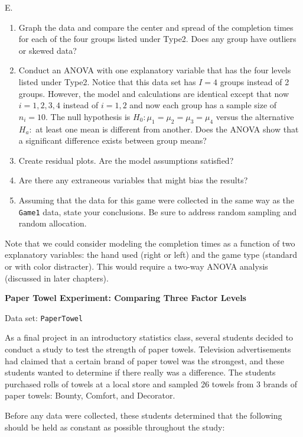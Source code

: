 \documentclass[
]{report}
\newcounter{excount}
\renewcommand{\theexcount}{E\arabic{excount}}
\begin{document}
\begin{list}{\theexcount.}{ \setlength{\itemsep}{1.2em}}
    \begin{enumerate}
      \item Graph the data and compare the center and spread of the completion times for each of the four groups listed under Type2. Does any group have outliers or skewed data?
      \item Conduct an ANOVA with one explanatory variable that has the four levels listed under Type2. Notice that this data set has $I = 4$ groups instead of 2 groups. However, the model and calculations are identical except that now $i = 1, 2, 3, 4$ instead of $i = 1, 2$ and now each group has a sample size of $n_i = 10$. The null hypothesis is $H_0\colon \mu_1 = \mu_2 = \mu_3 = \mu_4$ versus the alternative $H_a\colon$ at least one mean is different from another. Does the ANOVA show that a significant difference exists between group means?
      \item Create residual plots. Are the model assumptions satisfied?
      \item Are there any extraneous variables that might bias the results?
      \item Assuming that the data for this game were collected in the same way as the \texttt{Game1} data, state your conclusions. Be sure to address random sampling and random allocation.
    \end{enumerate}
    
Note that we could consider modeling the completion times as a function of two explanatory variables: the hand used (right or left) and the game type (standard or with color distracter). This would require a two-way ANOVA analysis (discussed in later chapters).

  \item \textbf{Paper Towel Experiment: Comparing Three Factor Levels}

Data set: \texttt{PaperTowel}

As a final project in an introductory statistics class, several students decided to conduct a study to test the strength of paper towels. Television advertisements had claimed that a certain brand of paper towel was the strongest, and these students wanted to determine if there really was a difference. The students purchased rolls of towels at a local store and sampled 26 towels from 3 brands of paper towels: Bounty, Comfort, and Decorator.

Before any data were collected, these students determined that the following should be held as constant as possible throughout the study:


\end{list}
\end{document}
